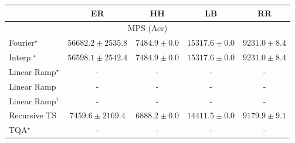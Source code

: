 \begin{tabular}{l|cccc|}
\toprule
            & ER & HH & LB & RR \\
\midrule
\multicolumn{5}{c}{\rule{0pt}{8pt}MPS (Aer)} \\
\midrule
Fourier$^\star$ & {\cellcolor[HTML]{4D004B}} \color[HTML]{F1F1F1} $56682.2\pm 2535.8$ & {\cellcolor[HTML]{F5FAFC}} \color[HTML]{000000} $7484.9\pm 0.0$ & {\cellcolor[HTML]{D4E3EF}} \color[HTML]{000000} $15317.6\pm 0.0$ & {\cellcolor[HTML]{EEF6FA}} \color[HTML]{000000} $9231.0\pm 8.4$ \\
Interp.$^\star$ & {\cellcolor[HTML]{4D004B}} \color[HTML]{F1F1F1} $56598.1\pm 2542.4$ & {\cellcolor[HTML]{F5FAFC}} \color[HTML]{000000} $7484.9\pm 0.0$ & {\cellcolor[HTML]{D4E3EF}} \color[HTML]{000000} $15317.6\pm 0.0$ & {\cellcolor[HTML]{EEF6FA}} \color[HTML]{000000} $9231.0\pm 8.4$ \\
Linear Ramp$^\star$ & {\cellcolor[HTML]{000000}} \color[HTML]{F1F1F1} {\cellcolor{white}} \color{black} - & {\cellcolor[HTML]{000000}} \color[HTML]{F1F1F1} {\cellcolor{white}} \color{black} - & {\cellcolor[HTML]{000000}} \color[HTML]{F1F1F1} {\cellcolor{white}} \color{black} - & {\cellcolor[HTML]{000000}} \color[HTML]{F1F1F1} {\cellcolor{white}} \color{black} - \\
Linear Ramp & {\cellcolor[HTML]{000000}} \color[HTML]{F1F1F1} {\cellcolor{white}} \color{black} - & {\cellcolor[HTML]{000000}} \color[HTML]{F1F1F1} {\cellcolor{white}} \color{black} - & {\cellcolor[HTML]{000000}} \color[HTML]{F1F1F1} {\cellcolor{white}} \color{black} - & {\cellcolor[HTML]{000000}} \color[HTML]{F1F1F1} {\cellcolor{white}} \color{black} - \\
Linear Ramp$^\dagger$ & {\cellcolor[HTML]{000000}} \color[HTML]{F1F1F1} {\cellcolor{white}} \color{black} - & {\cellcolor[HTML]{000000}} \color[HTML]{F1F1F1} {\cellcolor{white}} \color{black} - & {\cellcolor[HTML]{000000}} \color[HTML]{F1F1F1} {\cellcolor{white}} \color{black} - & {\cellcolor[HTML]{000000}} \color[HTML]{F1F1F1} {\cellcolor{white}} \color{black} - \\
Recursive TS & {\cellcolor[HTML]{F6FBFC}} \color[HTML]{000000} $7459.6\pm 2169.4$ & {\cellcolor[HTML]{F7FCFD}} \color[HTML]{000000} $6888.2\pm 0.0$ & {\cellcolor[HTML]{DAE7F1}} \color[HTML]{000000} $14411.5\pm 0.0$ & {\cellcolor[HTML]{EFF6FA}} \color[HTML]{000000} $9179.9\pm 9.1$ \\
TQA$^\star$ & {\cellcolor[HTML]{000000}} \color[HTML]{F1F1F1} {\cellcolor{white}} \color{black} - & {\cellcolor[HTML]{000000}} \color[HTML]{F1F1F1} {\cellcolor{white}} \color{black} - & {\cellcolor[HTML]{000000}} \color[HTML]{F1F1F1} {\cellcolor{white}} \color{black} - & {\cellcolor[HTML]{000000}} \color[HTML]{F1F1F1} {\cellcolor{white}} \color{black} - \\

\end{tabular}
